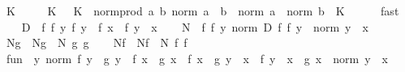 \begin{isabellebody}
\ K\isanewline
\ \ \ \ \ K{\isacharcolon}{\kern0pt}\ {\isachardoublequoteopen}{}\ {\isacharless}{\kern0pt}\ K{\isachardoublequoteclose}\ \ norm{\isacharunderscore}{\kern0pt}prod{\isacharcolon}{\kern0pt}\ {\isachardoublequoteopen}{\isasymAnd}a\ b{\isachardot}{\kern0pt}\ norm\ {\isacharparenleft}{\kern0pt}a\ {\isacharasterisk}{\kern0pt}{\isacharasterisk}{\kern0pt}\ b{\isacharparenright}{\kern0pt}\ {\isasymle}\ norm\ a\ {\isacharasterisk}{\kern0pt}\ norm\ b\ {\isacharasterisk}{\kern0pt}\ K{\isachardoublequoteclose}\isanewline
\ \ \ \ \isamarkupfalse%
\ fast\isanewline
\ \ \isamarkupfalse%
\ {\isacharquery}{\kern0pt}D\ {\isacharequal}{\kern0pt}\ {\isachardoublequoteopen}{\isasymlambda}f\ f{\isacharprime}{\kern0pt}\ y{\isachardot}{\kern0pt}\ f\ y\ {\isacharminus}{\kern0pt}\ f\ x\ {\isacharminus}{\kern0pt}\ f{\isacharprime}{\kern0pt}\ {\isacharparenleft}{\kern0pt}y\ {\isacharminus}{\kern0pt}\ x{\isacharparenright}{\kern0pt}{\isachardoublequoteclose}\isanewline
\ \ \isamarkupfalse%
\ {\isacharquery}{\kern0pt}N\ {\isacharequal}{\kern0pt}\ {\isachardoublequoteopen}{\isasymlambda}f\ f{\isacharprime}{\kern0pt}\ y{\isachardot}{\kern0pt}\ norm\ {\isacharparenleft}{\kern0pt}{\isacharquery}{\kern0pt}D\ f\ f{\isacharprime}{\kern0pt}\ y{\isacharparenright}{\kern0pt}\ {\isacharslash}{\kern0pt}\ norm\ {\isacharparenleft}{\kern0pt}y\ {\isacharminus}{\kern0pt}\ x{\isacharparenright}{\kern0pt}{\isachardoublequoteclose}\isanewline
\ \ \isamarkupfalse%
\ Ng\ \ {\isachardoublequoteopen}Ng\ {\isacharequal}{\kern0pt}\ {\isacharquery}{\kern0pt}N\ g\ g{\isacharprime}{\kern0pt}{\isachardoublequoteclose}\isanewline
\ \ \isamarkupfalse%
\ Nf\ \ {\isachardoublequoteopen}Nf\ {\isacharequal}{\kern0pt}\ {\isacharquery}{\kern0pt}N\ f\ f{\isacharprime}{\kern0pt}{\isachardoublequoteclose}\isanewline
\isanewline
\ \ \isamarkupfalse%
\ {\isacharquery}{\kern0pt}fun{}\ {\isacharequal}{\kern0pt}\ {\isachardoublequoteopen}{\isasymlambda}y{\isachardot}{\kern0pt}\ norm\ {\isacharparenleft}{\kern0pt}f\ y\ {\isacharasterisk}{\kern0pt}{\isacharasterisk}{\kern0pt}\ g\ y\ {\isacharminus}{\kern0pt}\ f\ x\ {\isacharasterisk}{\kern0pt}{\isacharasterisk}{\kern0pt}\ g\ x\ {\isacharminus}{\kern0pt}\ {\isacharparenleft}{\kern0pt}f\ x\ {\isacharasterisk}{\kern0pt}{\isacharasterisk}{\kern0pt}\ g{\isacharprime}{\kern0pt}\ {\isacharparenleft}{\kern0pt}y\ {\isacharminus}{\kern0pt}\ x{\isacharparenright}{\kern0pt}\ {\isacharplus}{\kern0pt}\ f{\isacharprime}{\kern0pt}\ {\isacharparenleft}{\kern0pt}y\ {\isacharminus}{\kern0pt}\ x{\isacharparenright}{\kern0pt}\ {\isacharasterisk}{\kern0pt}{\isacharasterisk}{\kern0pt}\ g\ x{\isacharparenright}{\kern0pt}{\isacharparenright}{\kern0pt}\ {\isacharslash}{\kern0pt}\ norm\ {\isacharparenleft}{\kern0pt}y\ {\isacharminus}{\kern0pt}\ x{\isacharparenright}{\kern0pt}{\isachardoublequoteclose}\isanewline

\end{isabellebody}

